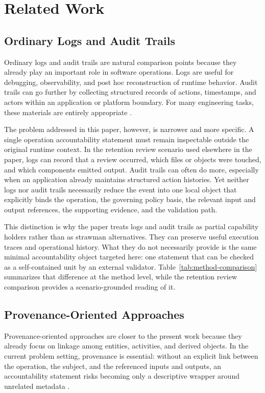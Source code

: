 \section{Related Work}

\subsection{Ordinary Logs and Audit Trails}

Ordinary logs and audit trails are natural comparison points because they already play an important role in software operations. Logs are useful for debugging, observability, and post hoc reconstruction of runtime behavior. Audit trails can go further by collecting structured records of actions, timestamps, and actors within an application or platform boundary. For many engineering tasks, these materials are entirely appropriate \cite{kent2006sp80092,oliner2012loganalysis}.

The problem addressed in this paper, however, is narrower and more specific. A single operation accountability statement must remain inspectable outside the original runtime context. In the retention review scenario used elsewhere in the paper, logs can record that a review occurred, which files or objects were touched, and which components emitted output. Audit trails can often do more, especially when an application already maintains structured action histories. Yet neither logs nor audit trails necessarily reduce the event into one local object that explicitly binds the operation, the governing policy basis, the relevant input and output references, the supporting evidence, and the validation path.

This distinction is why the paper treats logs and audit trails as partial capability holders rather than as strawman alternatives. They can preserve useful execution traces and operational history. What they do not necessarily provide is the same minimal accountability object targeted here: one statement that can be checked as a self-contained unit by an external validator. Table~\ref{tab:method-comparison} summarizes that difference at the method level, while the retention review comparison provides a scenario-grounded reading of it.

\subsection{Provenance-Oriented Approaches}

Provenance-oriented approaches are closer to the present work because they already focus on linkage among entities, activities, and derived objects. In the current problem setting, provenance is essential: without an explicit link between the operation, the subject, and the referenced inputs and outputs, an accountability statement risks becoming only a descriptive wrapper around unrelated metadata \cite{moreau2013provdm,herschel2017surveyprovenance}.

